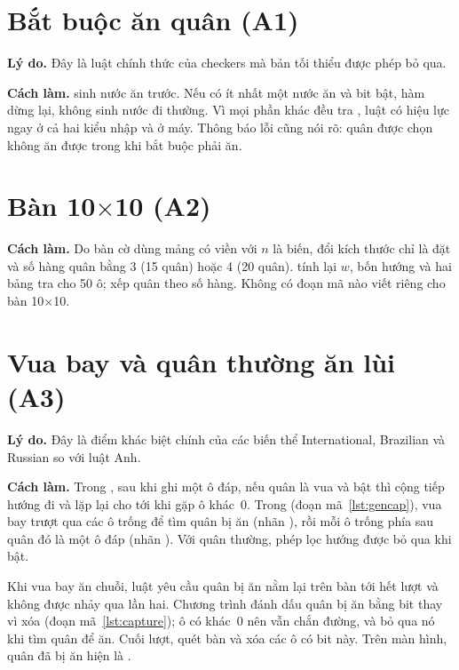 \section{Bắt buộc ăn quân (A1)}

\textbf{Lý do.} Đây là luật chính thức của checkers mà bản tối thiểu được phép bỏ qua.

\textbf{Cách làm.}  sinh nước ăn trước. Nếu có ít nhất một nước ăn và bit  bật, hàm dừng lại, không sinh nước đi thường. Vì mọi phần khác đều tra , luật có hiệu lực ngay ở cả hai kiểu nhập và ở máy. Thông báo lỗi cũng nói rõ: quân được chọn không ăn được trong khi bắt buộc phải ăn.

\section{Bàn 10$\times$10 (A2)}

\textbf{Cách làm.} Do bàn cờ dùng mảng có viền với $n$ là biến, đổi kích thước chỉ là đặt  và số hàng quân bằng 3 (15 quân) hoặc 4 (20 quân).  tính lại $w$, bốn hướng và hai bảng tra cho 50 ô;  xếp quân theo số hàng. Không có đoạn mã nào viết riêng cho bàn 10$\times$10.

\section{Vua bay và quân thường ăn lùi (A3)}\label{sec:ghost}

\textbf{Lý do.} Đây là điểm khác biệt chính của các biến thể International, Brazilian và Russian so với luật Anh.

\textbf{Cách làm.} Trong , sau khi ghi một ô đáp, nếu quân là vua và  bật thì cộng tiếp hướng đi và lặp lại cho tới khi gặp ô khác~0. Trong  (đoạn mã~\ref{lst:gencap}), vua bay trượt qua các ô trống để tìm quân bị ăn (nhãn ), rồi mỗi ô trống phía sau quân đó là một ô đáp (nhãn ). Với quân thường, phép lọc hướng được bỏ qua khi  bật.

Khi vua bay ăn chuỗi, luật yêu cầu quân bị ăn nằm lại trên bàn tới hết lượt và không được nhảy qua lần hai. Chương trình đánh dấu quân bị ăn bằng bit  thay vì xóa (đoạn mã~\ref{lst:capture}); ô có  khác~0 nên vẫn chắn đường, và  bỏ qua nó khi tìm quân để ăn. Cuối lượt,  quét bàn và xóa các ô có bit này. Trên màn hình, quân đã bị ăn hiện là .

